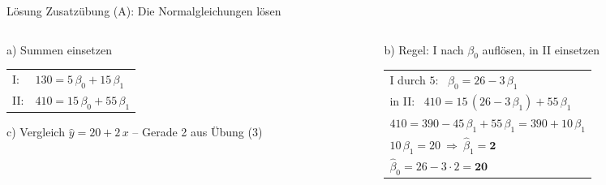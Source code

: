 \documentclass[aspectratio=169,11pt]{beamer}
\begin{document}
\begin{frame}{Lösung Zusatzübung (A): Die Normalgleichungen lösen}
  \begin{columns}[T]
    \begin{column}{0.44\textwidth}
      \begin{block}{a) Summen einsetzen}
        \renewcommand{\arraystretch}{1.5}
        \begin{tabular}{@{}l@{\ \ }l@{}}
          I:  & $130 = 5\,\beta_0 + 15\,\beta_1$ \\
          II: & $410 = 15\,\beta_0 + 55\,\beta_1$
        \end{tabular}
      \end{block}
      \begin{exampleblock}{c) Vergleich}
        $\hat{y} = 20 + 2\,x$ -- Gerade 2 aus Übung (3) \checkmark
      \end{exampleblock}
    \end{column}
    \begin{column}{0.54\textwidth}
      \begin{block}{b) Regel: I nach $\beta_0$ auflösen, in II einsetzen}
        \renewcommand{\arraystretch}{1.5}
        \begin{tabular}{@{}l@{}}
          I durch $5$: \ $\beta_0 = 26 - 3\,\beta_1$ \\
          in II: \ $410 = 15\,(26 - 3\,\beta_1) + 55\,\beta_1$ \\
          \phantom{in II: \ }$410 = 390 - 45\,\beta_1 + 55\,\beta_1 = 390 + 10\,\beta_1$ \\
          $10\,\beta_1 = 20 \ \Rightarrow\ \hat{\beta}_1 = \mathbf{2}$ \\
          $\hat{\beta}_0 = 26 - 3 \cdot 2 = \mathbf{20}$
        \end{tabular}
      \end{block}
    \end{column}
  \end{columns}
\end{frame}
\end{document}
